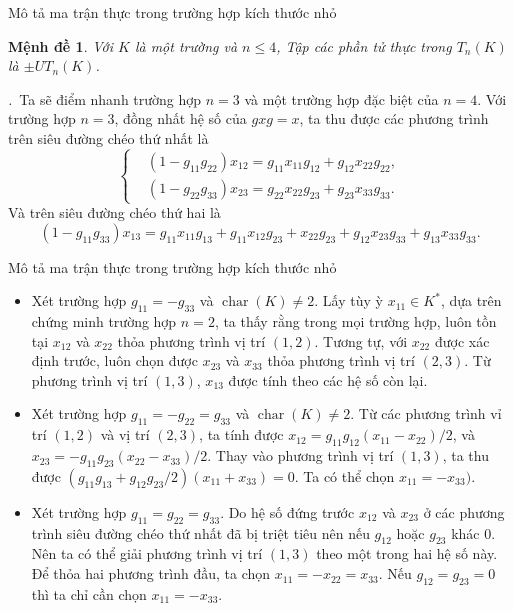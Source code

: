 \documentclass[11pt, aspectratio=169]{beamer}
\theoremstyle{plain}
\newtheorem{prop}[thm]{Mệnh đề}
\theoremstyle{definition}
\theoremstyle{remark}
\newcommand{\prfstart}{\textit{\proofname.}\ }
\DeclareMathOperator{\Char}{char}
\begin{document}
\begin{frame}{Mô tả ma trận thực trong trường hợp kích thước nhỏ}

\begin{prop} \label{prop:menhde2.3}
Với \( K \) là một trường và \( n \leq 4 \), Tập các phần tử thực trong $T_n(K)$ là $\pm UT_n(K)$.
\end{prop}

\prfstart Ta sẽ điểm nhanh trường hợp \( n = 3 \) và một trường hợp đặc biệt của \( n = 4 \). Với trường hợp \( n= 3 \), đồng nhất hệ số của \( g x g = x \), ta thu được các phương trình trên siêu đường chéo thứ nhất là
\[
\left\{ \begin{aligned}
    &(1 - g_{11} g_{22}) x_{12} = g_{11} x_{11} g_{12} + g_{12} x_{22} g_{22}, \\
    &(1 - g_{22} g_{33}) x_{23} = g_{22} x_{22} g_{23} + g_{23} x_{33} g_{33}.
\end{aligned} \right.
\]
Và trên siêu đường chéo thứ hai là
\[
    (1 - g_{11} g_{33}) x_{13} = g_{11} x_{11} g_{13} + g_{11} x_{12} g_{23}
    + x_{22} g_{23} + g_{12} x_{23} g_{33} + g_{13} x_{33} g_{33}.
\]

\end{frame}

\begin{frame}{Mô tả ma trận thực trong trường hợp kích thước nhỏ}

\begin{itemize}
    \item Xét trường hợp \( g_{11} = -g_{33} \) và \( \Char(K) \neq 2 \). Lấy tùy ỳ \( x_{11} \in K^*\), dựa trên chứng minh trường hợp \( n = 2 \), ta thấy rằng trong mọi trường hợp, luôn tồn tại \( x_{12} \) và \( x_{22} \) thỏa phương trình vị trí \( (1,2) \). Tương tự, với \( x_{22} \) được xác định trước, luôn chọn được \( x_{23} \) và \( x_{33} \) thỏa phương trình vị trí \( (2,3) \). Từ phương trình vị trí \( (1,3) \), \( x_{13} \) được tính theo các hệ số còn lại.

    \item Xét trường hợp \( g_{11} = -g_{22} = g_{33} \) và \( \Char(K) \neq 2 \). Từ các phương trình vỉ trí \( (1,2) \) và vị trí \( (2,3) \), ta tính được \( x_{12} = g_{11} g_{12} (x_{11} - x_{22}) / 2 \), và \( x_{23} = -g_{11} g_{23} (x_{22} - x_{33}) / 2 \). Thay vào phương trình vị trí \( (1,3) \), ta thu được \( (g_{11} g_{13} + g_{12} g_{23} / 2) (x_{11} + x_{33}) = 0 \). Ta có thể chọn \( x_{11} = - x_{33}) \).
    \item Xét trường hợp \( g_{11} = g_{22} = g_{33} \). Do hệ số đứng trước \( x_{12} \) và \( x_{23} \) ở các phương trình siêu đường chéo thứ nhất đã bị triệt tiêu nên nếu \( g_{12} \) hoặc \( g_{23} \) khác \( 0 \). Nên ta có thể giải phương trình vị trí \( (1,3) \) theo một trong hai hệ số này. Để thỏa hai phương trình đầu, ta chọn \( x_{11} = -x_{22} = x_{33} \). Nếu \( g_{12} = g_{23} = 0 \) thì ta chỉ cần chọn \( x_{11} = -x_{33} \).
\end{itemize}

\end{frame}
\end{document}
